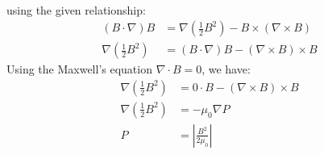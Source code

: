 \documentclass{article}
\begin{document}
\begin{itemize}
\begin{align*}
\end{align*}
using the given relationship:
\begin{align*}
    (B\cdot \nabla)B &= \nabla \left(\frac{1}{2}B^2\right)-B\times(\nabla\times B)\\
    \nabla \left(\frac{1}{2}B^2\right) &=(B\cdot \nabla)B-(\nabla \times B)\times B
\end{align*}
Using the Maxwell's equation \(\nabla\cdot B = 0\), we have:
\begin{align*}
    \nabla \left(\frac{1}{2}B^2\right) &=0\cdot B-(\nabla \times B)\times B\\
    \nabla \left(\frac{1}{2}B^2\right) &=-\mu_0\nabla P\\
    P &= \left|\frac{B^2}{2\mu_0}\right|
\end{align*}
\end{itemize}
\end{document}

